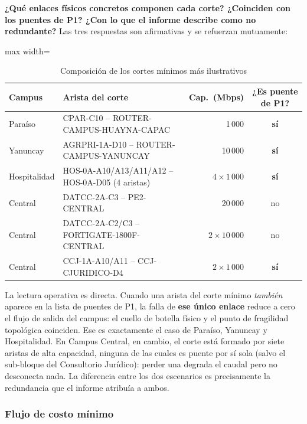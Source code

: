 \documentclass[10pt,a4paper]{extarticle}
\begin{document}
\textbf{¿Qué enlaces físicos concretos componen cada corte? ¿Coinciden con los puentes de
P1? ¿Con lo que el informe describe como no redundante?} Las tres respuestas son
afirmativas y se refuerzan mutuamente:

\begin{table}[H]
\centering
\caption{Composición de los cortes mínimos más ilustrativos}
\label{tab:cortes}
\small
\begin{adjustbox}{max width=\textwidth}
\begin{tabular}{llr@{\hspace{4mm}}c}
\toprule
\textbf{Campus} & \textbf{Arista del corte} & \textbf{Cap.\ (Mbps)} & \textbf{¿Es puente de P1?} \\
\midrule
Paraíso     & CPAR-C10 -- ROUTER-CAMPUS-HUAYNA-CAPAC & 1\,000 & \textbf{sí} \\
Yanuncay    & AGRPRI-1A-D10 -- ROUTER-CAMPUS-YANUNCAY & 10\,000 & \textbf{sí} \\
Hospitalidad& HOS-0A-A10/A13/A11/A12 -- HOS-0A-D05 (4 aristas) & $4\times 1\,000$ & \textbf{sí} \\
Central     & DATCC-2A-C3 -- PE2-CENTRAL & 20\,000 & no \\
Central     & DATCC-2A-C2/C3 -- FORTIGATE-1800F-CENTRAL & $2\times 10\,000$ & no \\
Central     & CCJ-1A-A10/A11 -- CCJ-CJURIDICO-D4 & $2\times 1\,000$ & \textbf{sí} \\
\bottomrule
\end{tabular}
\end{adjustbox}
\end{table}

La lectura operativa es directa. Cuando una arista del corte mínimo \textit{también} aparece
en la lista de puentes de P1, la falla de \textbf{ese único enlace} reduce a cero el flujo
de salida del campus: el cuello de botella físico y el punto de fragilidad topológica
coinciden. Ese es exactamente el caso de Paraíso, Yanuncay y Hospitalidad. En Campus
Central, en cambio, el corte está formado por siete aristas de alta capacidad, ninguna de
las cuales es puente por sí sola (salvo el sub-bloque del Consultorio Jurídico): perder una
degrada el caudal pero no desconecta nada. La diferencia entre los dos escenarios es
precisamente la redundancia que el informe atribuía a ambos.

\subsubsection{Flujo de costo mínimo}
\label{sec:mincost}
\end{document}
